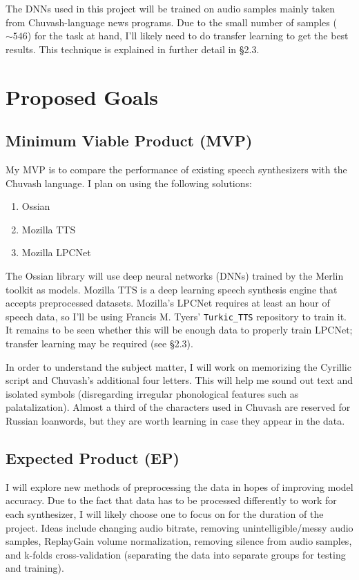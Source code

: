\documentclass[fleqn,10pt]{SelfArx} %
\begin{document}
The DNNs used in this project will be trained on audio samples mainly taken from Chuvash-language news programs. Due to the small number of samples ($\sim546$) for the task at hand, I'll likely need to do transfer learning to get the best results. This technique is explained in further detail in \S2.3.

\section{Proposed Goals}
\subsection{Minimum Viable Product (MVP)}
My MVP is to compare the performance of existing speech synthesizers with the Chuvash language. I plan on using the following solutions:
\begin{enumerate}
	\item Ossian
	\item Mozilla TTS
	\item Mozilla LPCNet
\end{enumerate}

The Ossian library will use deep neural networks (DNNs) trained by the Merlin toolkit as models. Mozilla TTS is a deep learning speech synthesis engine that accepts preprocessed datasets\cite{mozillaTTS}. Mozilla's LPCNet requires at least an hour of speech data\cite{mozillaLPC}, so I'll be using Francis M. Tyers' \texttt{Turkic\_TTS} repository to train it. It remains to be seen whether this will be enough data to properly train LPCNet; transfer learning may be required (see \S2.3).

In order to understand the subject matter, I will work on memorizing the Cyrillic script and Chuvash's additional four letters. This will help me sound out text and isolated symbols (disregarding irregular phonological features such as palatalization). Almost a third of the characters used in Chuvash are reserved for Russian loanwords\cite{wikChuvash}, but they are worth learning in case they appear in the data.

\subsection{Expected Product (EP)}
I will explore new methods of preprocessing the data in hopes of improving model accuracy. Due to the fact that data has to be processed differently to work for each synthesizer, I will likely choose one to focus on for the duration of the project. Ideas include changing audio bitrate, removing unintelligible/messy audio samples, ReplayGain volume normalization, removing silence from audio samples, and k-folds cross-validation (separating the data into separate groups for testing and training).
\end{document}
